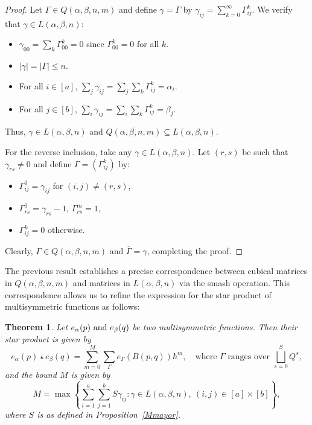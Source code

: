 \documentclass[11pt]{article}
\newtheorem{thm}{Theorem}%
\begin{document}
\begin{proof}
Let $\Gamma \in Q(\alpha,\beta,n,m)$ and define $\gamma = \overline{\Gamma}$ by $\gamma_{ij} = \sum_{k=0}^{\infty} \Gamma_{ij}^k$. We verify that $\gamma \in L(\alpha,\beta,n)$:
\begin{itemize}
    \item $\gamma_{00} = \sum_k \Gamma_{00}^k = 0$ since $\Gamma_{00}^k = 0$ for all $k$.
    \item $|\gamma| = |\Gamma| \leq n$.
    \item For all $i \in [a]$, $\sum_j \gamma_{ij} = \sum_j \sum_k \Gamma_{ij}^k = \alpha_i$.
    \item For all $j \in [b]$, $\sum_i \gamma_{ij} = \sum_i \sum_k \Gamma_{ij}^k = \beta_j$.
\end{itemize}
Thus, $\gamma \in L(\alpha,\beta,n)$ and $\overline{Q(\alpha,\beta,n,m)} \subseteq L(\alpha,\beta,n)$.

For the reverse inclusion, take any $\gamma \in L(\alpha,\beta,n)$. Let $(r,s)$ be such that $\gamma_{rs} \neq 0$ and define $\Gamma = (\Gamma_{ij}^k)$ by:
\begin{itemize}
    \item $\Gamma_{ij}^0 = \gamma_{ij}$ for $(i,j) \neq (r,s)$,
    \item $\Gamma_{rs}^0 = \gamma_{rs} - 1$, \quad $\Gamma_{rs}^m = 1$,
    \item $\Gamma_{ij}^k = 0$ otherwise.
\end{itemize}
Clearly, $\Gamma \in Q(\alpha,\beta,n,m)$ and $\overline{\Gamma} = \gamma$, completing the proof.
\end{proof}



The previous result establishes a precise correspondence between cubical matrices in $Q(\alpha, \beta, n, m)$ and matrices in $L(\alpha, \beta, n)$ via the smash operation. This correspondence allows us to refine the expression for the star product of multisymmetric functions as follows:
\begin{thm}
Let $ e_{\alpha}(p) \) and \( e_{\beta}(q) $ be two multisymmetric functions. Then their star product is given by
$$
e_{\alpha}(p)\star e_{\beta}(q) = \sum_{m=0}^{M} \sum_{\Gamma} e_\Gamma(B(p,q)) \hbar^m,
\quad \text{where } \Gamma \text{ ranges over } \bigsqcup_{s=0}^{S} Q^{s},
$$
and the bound \( M \) is given by
$$
M = \max\left\{ \sum_{i=1}^{a} \sum_{j=1}^{b} S \gamma_{ij} : \gamma \in L(\alpha,\beta,n),\ (i,j)\in[a] \times [b] \right\},
$$
where $S$ is as defined in Proposition~\ref{Mmayor}.
\end{thm}
\end{document}
